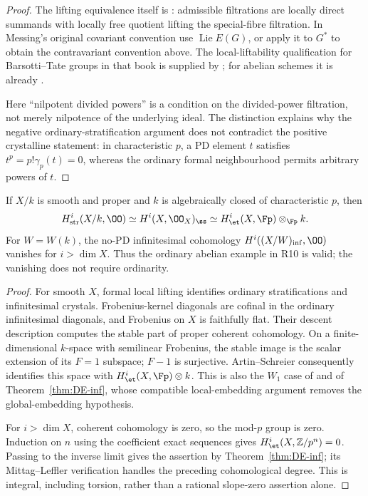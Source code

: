 \begin{proof}
The lifting equivalence itself is \cite[Chapter~V, Theorem~1.6 for Barsotti--Tate groups; Theorem~1.10 for abelian schemes]{Messing1972}: admissible filtrations are locally direct summands with locally free quotient lifting the special-fibre filtration.  In Messing's original covariant convention use $\operatorname{Lie}E(G)$, or apply it to $G^*$ to obtain the contravariant convention above.  The local-liftability qualification for Barsotti--Tate groups in that book is supplied by \cite[Th\'eor\`eme~4.4 and Corollary~4.7]{Illusie1985BT}; for abelian schemes it is already \cite[Chapter~IV, Lemma~2.8.1]{Messing1972}.

Here ``nilpotent divided powers'' is a condition on the divided-power filtration, not merely nilpotence of the underlying ideal.  The distinction explains why the negative ordinary-stratification argument does not contradict the positive crystalline statement: in characteristic $p$, a PD element $t$ satisfies $t^p=p!\gamma_p(t)=0$, whereas the ordinary formal neighbourhood permits arbitrary powers of $t$.
\end{proof}

\begin{proposition}[R10, scans 7:16--17]\label{prop:DE-R10}
If $X/k$ is smooth and proper and $k$ is algebraically closed of characteristic $p$, then
\[
 H^i_{\mathrm{str}}(X/k,\OO)
 \simeq H^i(X,\OO_X)_{\ss}
 \simeq H^i_{\et}(X,\Fp)\otimes_{\Fp}k.
\]
For $W=W(k)$, the no-PD infinitesimal cohomology $H^i((X/W)_{\inf},\OO)$ vanishes for $i>\dim X$.  Thus the ordinary abelian example in R10 is valid; the vanishing does not require ordinarity.
\end{proposition}
\begin{proof}
For smooth $X$, formal local lifting identifies ordinary stratifications and infinitesimal crystals.  Frobenius-kernel diagonals are cofinal in the ordinary infinitesimal diagonals, and Frobenius on $X$ is faithfully flat.  Their descent description computes the stable part of proper coherent cohomology.  On a finite-dimensional $k$-space with semilinear Frobenius, the stable image is the scalar extension of its $F=1$ subspace; $F-1$ is surjective.  Artin--Schreier consequently identifies this space with $H^i_{\et}(X,\Fp)\otimes k$.  This is also the $W_1$ case of \cite[Corollary~4.7]{Ogus1975} and of Theorem~\ref{thm:DE-inf}, whose compatible local-embedding argument removes the global-embedding hypothesis.

For $i>\dim X$, coherent cohomology is zero, so the mod-$p$ \etale group is zero.  Induction on $n$ using the coefficient exact sequences gives $H^i_{\et}(X,\mathbb Z/p^n)=0$.  Passing to the inverse limit gives the assertion by Theorem~\ref{thm:DE-inf}; its Mittag--Leffler verification handles the preceding cohomological degree.  This is integral, including torsion, rather than a rational slope-zero assertion alone.
\end{proof}
